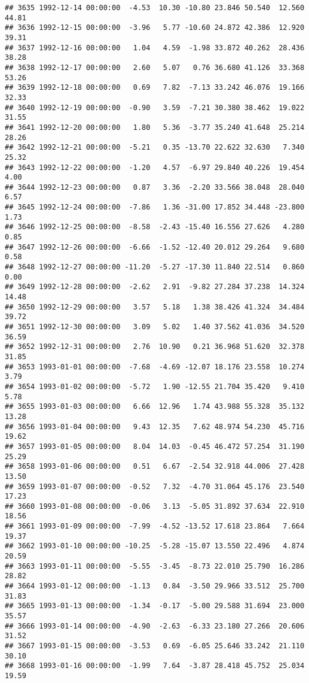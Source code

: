 \documentclass{article}\usepackage{graphicx, color}
\makeatletter
\newenvironment{kframe}{%
 \def\at@end@of@kframe{}%
 \ifinner\ifhmode%
  \def\at@end@of@kframe{\end{minipage}}%
  \begin{minipage}{\columnwidth}%
 \fi\fi%
 \def\FrameCommand##1{\hskip\@totalleftmargin \hskip-\fboxsep
 \colorbox{shadecolor}{##1}\hskip-\fboxsep
     \hskip-\linewidth \hskip-\@totalleftmargin \hskip\columnwidth}%
 \MakeFramed {\advance\hsize-\width
   \@totalleftmargin\z@ \linewidth\hsize
   \@setminipage}}%
 {\par\unskip\endMakeFramed%
 \at@end@of@kframe}
\newenvironment{knitrout}{}{} %
\makeatother
\begin{document}
\begin{knitrout}
\begin{kframe}
\begin{verbatim}
## 3635 1992-12-14 00:00:00  -4.53  10.30 -10.80 23.846 50.540  12.560  44.81
## 3636 1992-12-15 00:00:00  -3.96   5.77 -10.60 24.872 42.386  12.920  39.31
## 3637 1992-12-16 00:00:00   1.04   4.59  -1.98 33.872 40.262  28.436  38.28
## 3638 1992-12-17 00:00:00   2.60   5.07   0.76 36.680 41.126  33.368  53.26
## 3639 1992-12-18 00:00:00   0.69   7.82  -7.13 33.242 46.076  19.166  32.33
## 3640 1992-12-19 00:00:00  -0.90   3.59  -7.21 30.380 38.462  19.022  31.55
## 3641 1992-12-20 00:00:00   1.80   5.36  -3.77 35.240 41.648  25.214  28.26
## 3642 1992-12-21 00:00:00  -5.21   0.35 -13.70 22.622 32.630   7.340  25.32
## 3643 1992-12-22 00:00:00  -1.20   4.57  -6.97 29.840 40.226  19.454   4.00
## 3644 1992-12-23 00:00:00   0.87   3.36  -2.20 33.566 38.048  28.040   6.57
## 3645 1992-12-24 00:00:00  -7.86   1.36 -31.00 17.852 34.448 -23.800   1.73
## 3646 1992-12-25 00:00:00  -8.58  -2.43 -15.40 16.556 27.626   4.280   0.85
## 3647 1992-12-26 00:00:00  -6.66  -1.52 -12.40 20.012 29.264   9.680   0.58
## 3648 1992-12-27 00:00:00 -11.20  -5.27 -17.30 11.840 22.514   0.860   0.00
## 3649 1992-12-28 00:00:00  -2.62   2.91  -9.82 27.284 37.238  14.324  14.48
## 3650 1992-12-29 00:00:00   3.57   5.18   1.38 38.426 41.324  34.484  39.72
## 3651 1992-12-30 00:00:00   3.09   5.02   1.40 37.562 41.036  34.520  36.59
## 3652 1992-12-31 00:00:00   2.76  10.90   0.21 36.968 51.620  32.378  31.85
## 3653 1993-01-01 00:00:00  -7.68  -4.69 -12.07 18.176 23.558  10.274   3.79
## 3654 1993-01-02 00:00:00  -5.72   1.90 -12.55 21.704 35.420   9.410   5.78
## 3655 1993-01-03 00:00:00   6.66  12.96   1.74 43.988 55.328  35.132  13.28
## 3656 1993-01-04 00:00:00   9.43  12.35   7.62 48.974 54.230  45.716  19.62
## 3657 1993-01-05 00:00:00   8.04  14.03  -0.45 46.472 57.254  31.190  25.29
## 3658 1993-01-06 00:00:00   0.51   6.67  -2.54 32.918 44.006  27.428  13.50
## 3659 1993-01-07 00:00:00  -0.52   7.32  -4.70 31.064 45.176  23.540  17.23
## 3660 1993-01-08 00:00:00  -0.06   3.13  -5.05 31.892 37.634  22.910  18.56
## 3661 1993-01-09 00:00:00  -7.99  -4.52 -13.52 17.618 23.864   7.664  19.37
## 3662 1993-01-10 00:00:00 -10.25  -5.28 -15.07 13.550 22.496   4.874  20.59
## 3663 1993-01-11 00:00:00  -5.55  -3.45  -8.73 22.010 25.790  16.286  28.82
## 3664 1993-01-12 00:00:00  -1.13   0.84  -3.50 29.966 33.512  25.700  31.83
## 3665 1993-01-13 00:00:00  -1.34  -0.17  -5.00 29.588 31.694  23.000  35.57
## 3666 1993-01-14 00:00:00  -4.90  -2.63  -6.33 23.180 27.266  20.606  31.52
## 3667 1993-01-15 00:00:00  -3.53   0.69  -6.05 25.646 33.242  21.110  30.10
## 3668 1993-01-16 00:00:00  -1.99   7.64  -3.87 28.418 45.752  25.034  19.59

\end{verbatim}
\end{kframe}
\end{knitrout}
\end{document}
